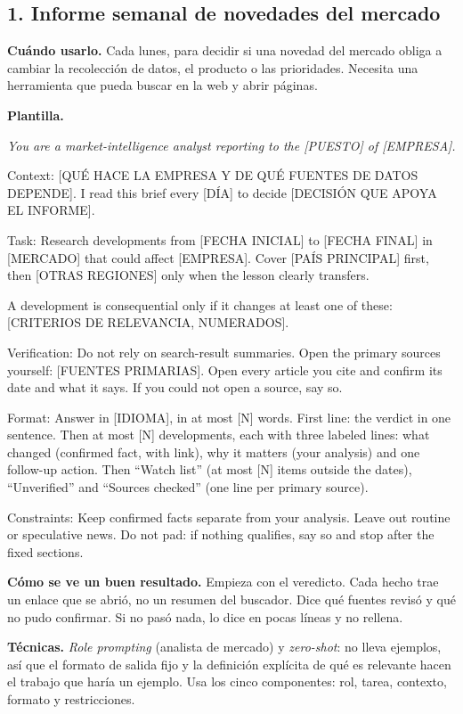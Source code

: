 \documentclass[11pt,letterpaper]{article}
\newenvironment{prompt}{%
  \begin{center}\begin{minipage}{0.92\textwidth}\color{black!80}\small
  \setlength{\parskip}{0.4em}\itshape}{%
  \end{minipage}\end{center}}
\newcommand{\entrada}[5]{%
  \subsection*{#1}
  \textbf{Cuándo usarlo.} #2

  \textbf{Plantilla.}
  \begin{prompt}#3\end{prompt}

  \textbf{Cómo se ve un buen resultado.} #4

  \textbf{Técnicas.} #5}
\begin{document}
\entrada{1. Informe semanal de novedades del mercado}
  {Cada lunes, para decidir si una novedad del mercado obliga a cambiar la
  recolección de datos, el producto o las prioridades. Necesita una
  herramienta que pueda buscar en la web y abrir páginas.}
  {You are a market-intelligence analyst reporting to the [PUESTO] of
  [EMPRESA].

  Context: [QUÉ HACE LA EMPRESA Y DE QUÉ FUENTES DE DATOS DEPENDE]. I read
  this brief every [DÍA] to decide [DECISIÓN QUE APOYA EL INFORME].

  Task: Research developments from [FECHA INICIAL] to [FECHA FINAL] in
  [MERCADO] that could affect [EMPRESA]. Cover [PAÍS PRINCIPAL] first, then
  [OTRAS REGIONES] only when the lesson clearly transfers.

  A development is consequential only if it changes at least one of these:
  [CRITERIOS DE RELEVANCIA, NUMERADOS].

  Verification: Do not rely on search-result summaries. Open the primary
  sources yourself: [FUENTES PRIMARIAS]. Open every article you cite and
  confirm its date and what it says. If you could not open a source, say so.

  Format: Answer in [IDIOMA], in at most [N] words. First line: the verdict
  in one sentence. Then at most [N] developments, each with three labeled
  lines: what changed (confirmed fact, with link), why it matters (your
  analysis) and one follow-up action. Then \enquote{Watch list} (at most
  [N] items outside the dates), \enquote{Unverified} and \enquote{Sources
  checked} (one line per primary source).

  Constraints: Keep confirmed facts separate from your analysis. Leave out
  routine or speculative news. Do not pad: if nothing qualifies, say so and
  stop after the fixed sections.}
  {Empieza con el veredicto. Cada hecho trae un enlace que se abrió, no un
  resumen del buscador. Dice qué fuentes revisó y qué no pudo confirmar. Si
  no pasó nada, lo dice en pocas líneas y no rellena.}
  {\emph{Role prompting} (analista de mercado) y \emph{zero-shot}: no lleva
  ejemplos, así que el formato de salida fijo y la definición explícita de
  qué es relevante hacen el trabajo que haría un ejemplo. Usa los cinco
  componentes: rol, tarea, contexto, formato y restricciones.}
\end{document}
